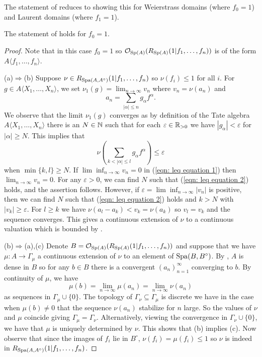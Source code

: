 The statement of  reduces to showing this for Weierstrass domains (where $f_{0}=1$) and Laurent domains (where $f_{1}=1$). 
\begin{lemma}\label{lem: key vdP Weierstrass}
    The statement of  holds for $f_{0}=1$. 
\end{lemma}
\begin{proof}
    Note that in this case $f_{0}=1$ so $\mathcal{O}_{\mathrm{Sp}(A)}(R_{\mathrm{Sp}(A)}(1|f_{1},\dots,f_{n}))$ is of the form $A\langle f_{1},\dots,f_{n}\rangle$. 

    (a)$\Rightarrow$(b) Suppose $\nu\in R_{\mathrm{Spa}(A,A^{\circ})}(1|f_{1},\dots,f_{n})$ so $\nu(f_{i})\leq 1$ for all $i$. For $g\in A\langle X_{1},\dots,X_{n}\rangle$, we set $\nu_{1}(g)=\lim_{n\to\infty}v_{n}$ where $v_{n}=\nu(a_{n})$ and 
    \begin{equation}\label{eqn: leq equation 1}
        a_{n}=\sum_{|\alpha|\leq n}g_{\alpha}f^{\alpha}.
    \end{equation}
    We observe that the limit $\nu_{1}(g)$ converges as by definition of the Tate algebra $A\langle X_{1},\dots,X_{n}\rangle$ there is an $N\in\mathbb{N}$ such that for each $\varepsilon\in\mathbb{R}_{>0}$ we have $|g_{\alpha}|<\varepsilon$ for $|\alpha|\geq N$. This implies that 
    \begin{equation}\label{eqn: leq equation 2}
        \nu\left(\sum_{k<|\alpha|\leq l}g_{\alpha}f^{\alpha}\right)\leq\varepsilon
    \end{equation}
    when $\min\{k,l\}\geq N$. If $\lim\inf_{n\to\infty}v_{n}=0$ in (\ref{eqn: leq equation 1}) then $\lim_{n\to\infty}v_{n}=0$. For any $\varepsilon>0$, we can find $N$ such that (\ref{eqn: leq equation 2}) holds, and the assertion follows. However, if $\varepsilon=\lim\inf_{n\to\infty}|v_{n}|$ is positive, then we can find $N$ such that (\ref{eqn: leq equation 2}) holds and $k>N$ with $|v_{k}|\geq\varepsilon$. For $l\geq k$ we have $\nu(a_{l}-a_{k})<v_{k}=\nu(a_{k})$ so $v_{l}=v_{k}$ and the sequence converges. This gives a continuous extension of $\nu$ to a continuous valuation which is bounded by . 

    (b)$\Rightarrow$(a),(c) Denote $B=\mathcal{O}_{\mathrm{Sp}(A)}(R_{\mathrm{Sp}(A)}(1|f_{1},\dots,f_{n}))$ and suppose that we have $\mu:A\to \Gamma_{\mu}$ a continuous extension of $\nu$ to an element of $\mathrm{Spa}(B,B^{\circ})$. By , $A$ is dense in $B$ so for any $b\in B$ there is a convergent $(a_{n})_{n=1}^{\infty}$ converging to $b$. By continuity of $\mu$, we have 
    $$\mu(b)=\lim_{n\to\infty}\mu(a_{n})=\lim_{n\to\infty}\nu(a_{n})$$
    as sequences in $\Gamma_{\mu}\cup\{0\}$. The topology of $\Gamma_{\nu}\subseteq\Gamma_{\mu}$ is discrete we have in the case when $\mu(b)\neq0$ that the sequence $\nu(a_{n})$ stabilize for $n$ large. So the values of $\nu$ and $\mu$ coincide giving $\Gamma_{\mu}=\Gamma_{\nu}$. Alternatively, viewing the convergence in $\Gamma_{\nu}\cup\{0\}$, we have that $\mu$ is uniquely determined by $\nu$. This shows that (b) implies (c). Now observe that since the images of $f_{i}$ lie in $B^{\circ}$, $\nu(f_{i})=\mu(f_{i})\leq 1$ so $\nu$ is indeed in $R_{\mathrm{Spa}(A,A^{\circ})}(1|f_{1},\dots,f_{n})$. 
\end{proof}
